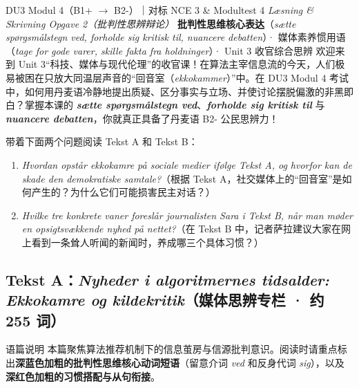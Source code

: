 {DU3 Modul 4（B1+ $\rightarrow$ B2-）｜对标 NCE 3 \& Modultest 4 \textit{Læsning \& Skrivning Opgave 2（批判性思辨辩论）}}
{\textbf{批判性思维核心表达}（\textit{sætte spørgsmålstegn ved, forholde sig kritisk til, nuancere debatten}）· 媒体素养惯用语（\textit{tage for gode varer, skille fakta fra holdninger}）· Unit 3 收官综合思辨}
{欢迎来到 Unit 3“科技、媒体与现代伦理”的收官课！在算法主宰信息流的今天，人们极易被困在只放大同温层声音的“回音室（\textit{ekkokammer}）”中。在 DU3 Modul 4 考试中，如何用丹麦语冷静地提出质疑、区分事实与立场、并使讨论摆脱偏激的非黑即白？掌握本课的 \textbf{\textit{sætte spørgsmålstegn ved}}、\textbf{\textit{forholde sig kritisk til}} 与 \textbf{\textit{nuancere debatten}}，你就真正具备了丹麦语 B2- 公民思辨力！}

\begin{foerduleaeser}
带着下面两个问题阅读 Tekst A 和 Tekst B：
\begin{enumerate}
  \item \textit{Hvordan opstår ekkokamre på sociale medier ifølge Tekst A, og hvorfor kan de skade den demokratiske samtale?}（根据 Tekst A，社交媒体上的“回音室”是如何产生的？为什么它们可能损害民主对话？）
  \item \textit{Hvilke tre konkrete vaner foreslår journalisten Sara i Tekst B, når man møder en opsigtsvækkende nyhed på nettet?}（在 Tekst B 中，记者萨拉建议大家在网上看到一条耸人听闻的新闻时，养成哪三个具体习惯？）
\end{enumerate}
\end{foerduleaeser}


\subsection*{Tekst A：\textit{Nyheder i algoritmernes tidsalder: Ekkokamre og kildekritik}（媒体思辨专栏 · 约 255 词）}

\begin{tipbox}{语篇说明}
本篇聚焦算法推荐机制下的信息茧房与信源批判意识。阅读时请重点标出\textbf{\color{NCDNavy}深蓝色加粗的批判性思维核心动词短语}（留意介词 \textit{ved} 和反身代词 \textit{sig}），以及\textbf{\color{NCDRed}深红色加粗的习惯搭配与从句衔接}。
\end{tipbox}

